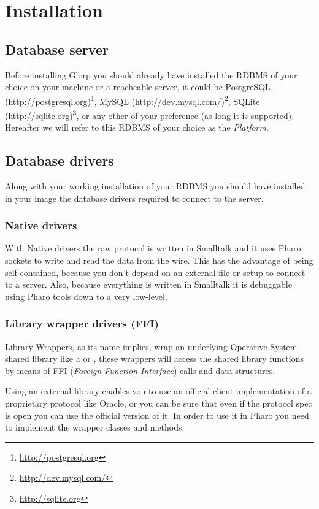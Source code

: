 \documentclass[10pt,twoside,english]{_support/latex/sbabook/sbabook}
\begin{document}
\chapter{Installation}\section{Database server}
Before installing Glorp you should already have installed the RDBMS of your choice on your machine or a reacheable server, it could be \href{http://postgresql.org}{PostgreSQL (http://postgresql.org)}\footnote{\url{http://postgresql.org}}, \href{http://dev.mysql.com/}{MySQL (http://dev.mysql.com/)}\footnote{\url{http://dev.mysql.com/}}, \href{http://sqlite.org}{SQLite (http://sqlite.org)}\footnote{\url{http://sqlite.org}}, or any other of your preference (as long it is supported). Hereafter we will refer to this RDBMS of your choice as the \textit{Platform}.
\section{Database drivers}
Along with your working installation of your RDBMS you should have installed in
your image the database drivers required to connect to the server.
\subsection{Native drivers}
With Native drivers the raw protocol is written in Smalltalk and it uses Pharo
sockets to write and read the data from the wire. This has the advantage of
being self contained, because you don't depend on an external file or setup
to connect to a server. Also, because everything is written in Smalltalk
it is debuggable using Pharo tools down to a very low-level.
\subsection{Library wrapper drivers (FFI)}
Library Wrappers, as its name implies, wrap an underlying Operative System
shared library like a  or , these wrappers will access
the shared library functions by means of FFI
(\textit{Foreign Function Interface}) calls and data structures.

Using an external library enables you to use an official client implementation
of a proprietary protocol like Oracle, or you can be sure that even
if the protocol spec is open you can use the official version of it.
In order to use it in Pharo you need to implement the wrapper classes and methods.
\end{document}
